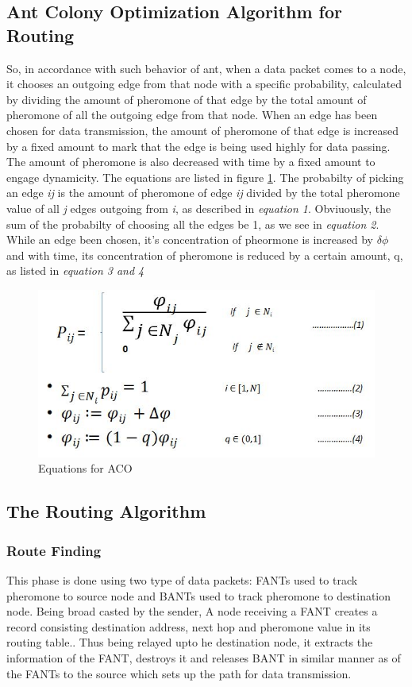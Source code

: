 \subsection{Ant Colony Optimization Algorithm for Routing}
So, in accordance with such behavior of ant, when a data packet comes to a node, it chooses an outgoing edge from that node with a specific probability, calculated by dividing the amount of pheromone of that edge by the total amount of pheromone of all the outgoing edge from that node. When an edge has been chosen for data transmission, the amount of pheromone of that edge is increased by a fixed amount to mark that the edge is being used highly for data passing. The amount of pheromone is also decreased with time by a fixed amount to engage dynamicity. The equations are listed in figure \ref{eq}. The probabilty of picking an edge \textit{ij} is the amount of pheromone of edge \textit{ij} divided by the total pheromone value of all \textit{j} edges outgoing from \textit{i}, as described in \textit{equation 1}. Obviuously, the sum of the probabilty of choosing all the edges be 1, as we see in \textit{equation 2}. While an edge been chosen, it's concentration of pheormone is increased by $\delta \phi$ and with time, its concentration of pheromone is reduced by a certain amount, q, as listed in \textit{equation 3 and 4 }

\begin{figure}
    \centering
    \includegraphics[scale=0.6]{equations}
    \caption{Equations for ACO}
    \label{eq}
\end{figure}

\subsection{The Routing Algorithm}

\subsubsection{Route Finding}
This phase is done using two type of data packets: FANTs used to track pheromone to source node and BANTs used to track pheromone to destination node. Being broad casted by the sender, A node receiving a FANT creates a record consisting destination address, next hop and
pheromone value in its routing table.. Thus being relayed upto he destination node, it extracts the information of the FANT,  destroys it and releases BANT in similar manner as of the FANTs to the source which sets up the path for data transmission.

